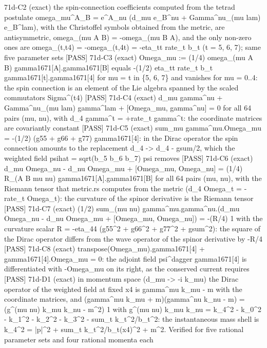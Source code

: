 \documentclass[
  10pt,
]{article}
\newenvironment{Shaded}{}{}
\newcommand{\NormalTok}[1]{#1}
\begin{document}
\begin{Shaded}
\begin{Highlighting}[]
\NormalTok{[PASS] 71d{-}C2  (exact) the spin{-}connection coefficients computed from the tetrad postulate omega\_mu\^{}A\_B = e\^{}A\_nu (d\_mu e\_B\^{}nu + Gamma\^{}nu\_(mu lam) e\_B\^{}lam), with the Christoffel symbols obtained from the metric, are antisymmetric, omega\_(mu A B) = {-}omega\_(mu B A), and the only non{-}zero ones are omega\_(t,t4) = {-}omega\_(t,4t) = {-}eta\_tt rate\_t b\_t (t = 5, 6, 7); same five parameter sets}
\NormalTok{[PASS] 71d{-}C3  (exact) Omega\_mu := (1/4) omega\_(mu A B) gamma1671[A].gamma1671[B] equals {-}(1/2) eta\_tt rate\_t b\_t gamma1671[t].gamma1671[4] for mu = t in \{5, 6, 7\} and vanishes for mu = 0..4: the spin connection is an element of the Lie algebra spanned by the scaled commutators Sigma\^{}(t4)}
\NormalTok{[PASS] 71d{-}C4  (exact) d\_mu gamma\^{}nu + Gamma\^{}nu\_(mu lam) gamma\^{}lam + [Omega\_mu, gamma\^{}nu] = 0 for all 64 pairs (mu, nu), with d\_4 gamma\^{}t = +rate\_t gamma\^{}t: the coordinate matrices are covariantly constant}
\NormalTok{[PASS] 71d{-}C5  (exact) sum\_mu gamma\^{}mu.Omega\_mu = {-}(1/2) (g55 + g66 + g77) gamma1671[4]: in the Dirac operator the spin connection amounts to the replacement d\_4 {-}\textgreater{} d\_4 {-} gsum/2, which the weighted field psihat = sqrt(b\_5 b\_6 b\_7) psi removes}
\NormalTok{[PASS] 71d{-}C6  (exact) d\_mu Omega\_nu {-} d\_nu Omega\_mu + [Omega\_mu, Omega\_nu] = (1/4) R\_(A B mu nu) gamma1671[A].gamma1671[B] for all 64 pairs (mu, nu), with the Riemann tensor that metric.rs computes from the metric (d\_4 Omega\_t = {-}rate\_t Omega\_t): the curvature of the spinor derivative is the Riemann tensor}
\NormalTok{[PASS] 71d{-}C7  (exact) (1/2) sum\_(mu nu) gamma\^{}mu.gamma\^{}nu.(d\_mu Omega\_nu {-} d\_nu Omega\_mu + [Omega\_mu, Omega\_nu]) = {-}(R/4) 1 with the curvature scalar R = {-}eta\_44 (g55\^{}2 + g66\^{}2 + g77\^{}2 + gsum\^{}2): the square of the Dirac operator differs from the wave operator of the spinor derivative by {-}R/4}
\NormalTok{[PASS] 71d{-}C8  (exact) transpose(Omega\_mu).gamma1671[4] + gamma1671[4].Omega\_mu = 0: the adjoint field psi\^{}dagger gamma1671[4] is differentiated with {-}Omega\_mu on its right, as the conserved current requires}
\NormalTok{[PASS] 71d{-}D1  (exact) in momentum space (d\_mu {-}\textgreater{} {-}i k\_mu) the Dirac operator of the weighted field at fixed x4 is gamma\^{}mu k\_mu {-} m with the coordinate matrices, and (gamma\^{}mu k\_mu + m)(gamma\^{}nu k\_nu {-} m) = (g\^{}(mu nu) k\_mu k\_nu {-} m\^{}2) 1 with g\^{}(mu nu) k\_mu k\_nu = k\_4\^{}2 {-} k\_0\^{}2 {-} k\_1\^{}2 {-} k\_2\^{}2 {-} k\_3\^{}2 {-} sum\_t k\_t\^{}2/b\_t\^{}2: the instantaneous mass shell is k\_4\^{}2 = |p|\^{}2 + sum\_t k\_t\^{}2/b\_t(x4)\^{}2 + m\^{}2. Verified for five rational parameter sets and four rational momenta each}

\end{Highlighting}
\end{Shaded}
\end{document}
